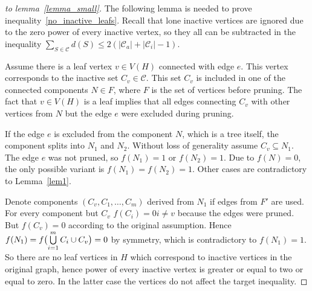 \documentclass[12pt]{article}
\newtheorem{proof}{Proof}
\begin{document}
\begin{proof}[to lemma~\ref{lemma_small}]
		The following lemma is needed to prove inequality~\eqref{no_inactive_leafs}.
         Recall that lone inactive vertices are ignored due to the zero power of every inactive vertex, so they all can be subtracted in the inequality $\sum_{S\in\mathcal{C}}d(S) \leqslant 2(|\mathcal{C}_a| + |\mathcal{C}_i| -1)$.

         Assume there is a leaf vertex $v\in V(H)$ connected with edge $e$. This vertex corresponds to the inactive set $C_v\in\mathcal{C}$. This set $C_v$ is included in one of the connected components $N\in F$, where $F$ is the set of vertices before pruning. The fact that $v \in V(H)$ is a leaf implies that all edges connecting $C_v$ with other vertices from $N$ but the edge $e$ were excluded during pruning.

         If the edge $e$ is excluded from the component $N$, which is a tree itself, the component splits into $N_1$ and $N_2$. Without loss of generality assume $C_v\subseteq N_1$. The edge $e$ was not pruned, so $f(N_1)=1$ or $f(N_2)=1$. Due to $f(N) = 0$, the only possible variant is $f(N_1) = f(N_2) = 1$. Other cases are contradictory to Lemma~\ref{lem1}.

         Denote components $(C_v,C_1,\ldots,C_m)$ derived from $N_1$ if edges from $F'$ are used. For every component but $C_v$ $f(C_i)=0  i \neq v$ because the edges were pruned. But $f(C_v)=0$ according to the original assumption. Hence $f(N_1) = f\bigl(\bigcup\limits_{i=1}^{m} C_i \cup C_v\bigr) = 0$ by symmetry, which is contradictory to $f(N_1) = 1$. So there are no leaf vertices in $H$ which correspond to inactive vertices in the original graph, hence power of every inactive vertex is greater or equal to two or equal to zero. In the latter case the vertices do not affect the target inequality.
    \end{proof}
\end{document}
